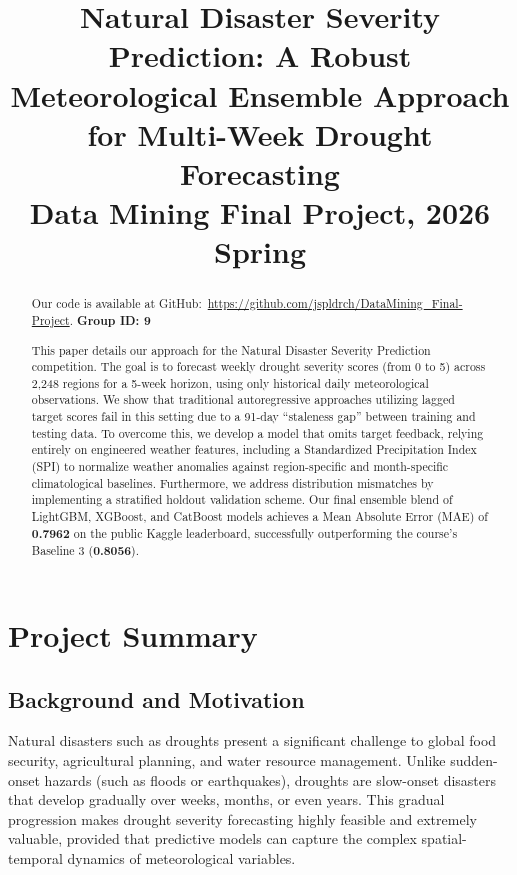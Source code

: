 \documentclass[conference]{IEEEtran}
\begin{document}

\title{Natural Disaster Severity Prediction: A Robust Meteorological Ensemble Approach for Multi-Week Drought Forecasting\\
{\footnotesize Data Mining Final Project, 2026 Spring}
}

\author{
\and
{}
}

\maketitle

\begin{abstract}
Our code is available at GitHub:~\href{https://github.com/jspldrch/DataMining_Final-Project}{\color{blue}https://github.com/jspldrch/DataMining\_Final-Project}. \textbf{Group ID: 9}

\noindent This paper details our approach for the Natural Disaster Severity Prediction competition. The goal is to forecast weekly drought severity scores (from 0 to 5) across 2,248 regions for a 5-week horizon, using only historical daily meteorological observations. We show that traditional autoregressive approaches utilizing lagged target scores fail in this setting due to a 91-day ``staleness gap'' between training and testing data. To overcome this, we develop a model that omits target feedback, relying entirely on engineered weather features, including a Standardized Precipitation Index (SPI) to normalize weather anomalies against region-specific and month-specific climatological baselines. Furthermore, we address distribution mismatches by implementing a stratified holdout validation scheme. Our final ensemble blend of LightGBM, XGBoost, and CatBoost models achieves a Mean Absolute Error (MAE) of \textbf{0.7962} on the public Kaggle leaderboard, successfully outperforming the course's Baseline 3 (\textbf{0.8056}).
\end{abstract}


\section{Project Summary}

\subsection{Background and Motivation}
Natural disasters such as droughts present a significant challenge to global food security, agricultural planning, and water resource management. Unlike sudden-onset hazards (such as floods or earthquakes), droughts are slow-onset disasters that develop gradually over weeks, months, or even years. This gradual progression makes drought severity forecasting highly feasible and extremely valuable, provided that predictive models can capture the complex spatial-temporal dynamics of meteorological variables. 
\end{document}
